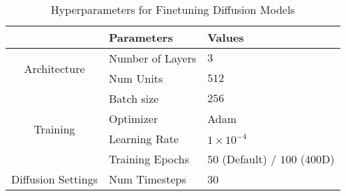 \begin{table*}[h]
\centering
\caption{Hyperparameters for Finetuning Diffusion Models}
\begin{tabular}{c|ll}
\toprule
& Parameters & Values \\
\midrule
\multirow{2}{*}{Architecture} & Number of Layers & $3$ \\
                              & Num Units & $512$\\
\midrule
\multirow{4}{*}{Training} & Batch size & $256$ \\
                          & Optimizer & Adam \\
                          & Learning Rate & $1 \times 10^{-4}$ \\
                          & Training Epochs & $50$ (Default) / $100$ (400D) \\
\midrule
\multirow{1}{*}{Diffusion Settings} & Num Timesteps & 30 \\ 
\bottomrule
\end{tabular}
\label{table:posterior hyperparams}
\end{table*}